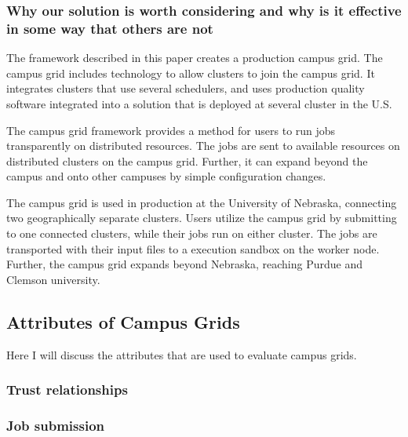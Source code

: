 \documentclass[11pt]{article}
\begin{document}






\subsubsection* {Why our solution is worth considering and why is it effective
in some way that others are not}

The framework described in this paper creates a production campus grid.  The campus grid includes technology to allow clusters to join the campus grid.  It integrates clusters that use several schedulers, and uses production quality software integrated into a solution that is deployed at several cluster in the U.S.

The campus grid framework provides a method for users to run jobs transparently on distributed resources.  The jobs are sent to available resources on distributed clusters on the campus grid.  Further, it can expand beyond the campus and onto other campuses by simple configuration changes.

The campus grid is used in production at the University of Nebraska, connecting two geographically separate clusters.  Users utilize the campus grid by submitting to one connected clusters, while their jobs run on either cluster.  The jobs are transported with their input files to a execution sandbox on the worker node.  Further, the campus grid expands beyond Nebraska, reaching Purdue and Clemson university.


\subsection{Attributes of Campus Grids}
Here I will discuss the attributes that are used to evaluate campus grids.

\subsubsection{Trust relationships}

\subsubsection{Job submission}
\end{document}
